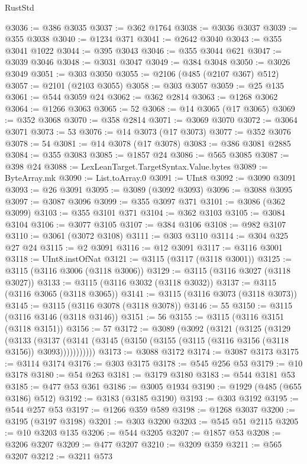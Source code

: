 \begin{lexlean}{RustStd}
\begin{coremodule}
@3036 := @386 @3035
@3037 := @362 @1764
@3038 := @3036 @3037
@3039 := @355 @3038
@3040 := @1234 @371
@3041 := @2642 @3040
@3043 := @355 @3041 @1022
@3044 := @395 @3043
@3046 := @355 @3044 @621
@3047 := @3039 @3046
@3048 := @3031 @3047
@3049 := @384 @3048
@3050 := @3026 @3049
@3051 := @303 @3050
@3055 := @2106 (@485 (@2107 @367) @512)
@3057 := @2101 (@2103 @3055)
@3058 := @303 @3057
@3059 := @25 @135
@3061 := @544 @3059 @24
@3062 := @362 @2814
@3063 := @1268 @3062
@3064 := @1266 @3063
@3065 := 52
@3068 := @14 @3065 (@17 @3065)
@3069 := @352 @3068
@3070 := @358 @2814
@3071 := @3069 @3070
@3072 := @3064 @3071
@3073 := 53
@3076 := @14 @3073 (@17 @3073)
@3077 := @352 @3076
@3078 := 54
@3081 := @14 @3078 (@17 @3078)
@3083 := @386 @3081 @2885
@3084 := @355 @3083
@3085 := @1857 @24
@3086 := @565 @3085
@3087 := @398 @24
@3088 := LexLeanTarget.TargetSyntax.Value.bytes
@3089 := ByteArray.mk
@3090 := List.toArray.{0}
@3091 := UInt8
@3092 := @3090 @3091
@3093 := @26 @3091
@3095 := @3089 (@3092 @3093)
@3096 := @3088 @3095
@3097 := @3087 @3096
@3099 := @355 @3097 @371
@3101 := @3086 (@362 @3099)
@3103 := @355 @3101 @371
@3104 := @362 @3103
@3105 := @3084 @3104
@3106 := @3077 @3105
@3107 := @384 @3106
@3108 := @982 @3107
@3110 := @3061 (@3072 @3108)
@3111 := @303 @3110
@3114 := @304 @325 @27 @24
@3115 := @2 @3091
@3116 := @12 @3091
@3117 := @3116 @3001
@3118 := UInt8.instOfNat
@3121 := @3115 (@3117 (@3118 @3001))
@3125 := @3115 (@3116 @3006 (@3118 @3006))
@3129 := @3115 (@3116 @3027 (@3118 @3027))
@3133 := @3115 (@3116 @3032 (@3118 @3032))
@3137 := @3115 (@3116 @3065 (@3118 @3065))
@3141 := @3115 (@3116 @3073 (@3118 @3073))
@3145 := @3115 (@3116 @3078 (@3118 @3078))
@3146 := 55
@3150 := @3115 (@3116 @3146 (@3118 @3146))
@3151 := 56
@3155 := @3115 (@3116 @3151 (@3118 @3151))
@3156 := 57
@3172 := @3089
    (@3092
      (@3121
        (@3125
          (@3129
            (@3133
              (@3137 (@3141 (@3145 (@3150 (@3155 (@3115 (@3116 @3156 (@3118 @3156)) @3093)))))))))))
@3173 := @3088 @3172
@3174 := @3087 @3173
@3175 := @3114 @3174
@3176 := @303 @3175
@3178 := @545 @256 @53
@3179 := @10 @3178
@3180 := @54 @263
@3181 := @3179 @3180
@3183 := @544 @3181 @53
@3185 := @477 @53 @361
@3186 := @3005 @1934
@3190 := @1929 (@485 (@655 @3186) @512)
@3192 := @3183 (@3185 @3190)
@3193 := @303 @3192
@3195 := @544 @257 @53
@3197 := @1266 @359 @589
@3198 := @1268 @3037
@3200 := @3195 (@3197 @3198)
@3201 := @303 @3200
@3203 := @545 @51 @2115
@3205 := @10 @3203 @135
@3206 := @544 @3205
@3207 := @1857 @53
@3208 := @3206 @3207
@3209 := @477 @3207
@3210 := @3209 @359
@3211 := @565 @3207
@3212 := @3211 @573

\end{coremodule}
\end{lexlean}
